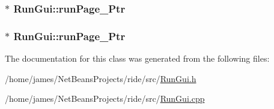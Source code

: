 \hypertarget{class_run_gui_a86764c1a0c9629fbce62c7cb13c5ee07}{
\subsubsection[{run\-Page\-\_\-2\-Ptr}]{$\ast$ Run\-Gui\-::run\-Page\-\_\-Ptr\hspace{0.3cm}{\ttfamily [private]}}}\label{class_run_gui_a86764c1a0c9629fbce62c7cb13c5ee07}
\hypertarget{class_run_gui_a7306b4df6c8619a98da052935a021cf8}{
\subsubsection[{run\-Page\-\_\-3\-Ptr}]{$\ast$ Run\-Gui\-::run\-Page\-\_\-Ptr\hspace{0.3cm}{\ttfamily [private]}}}\label{class_run_gui_a7306b4df6c8619a98da052935a021cf8}


The documentation for this class was generated from the following files\-:\begin{DoxyCompactItemize}
\item 
/home/james/\-Net\-Beans\-Projects/ride/src/\hyperlink{_run_gui_8h}{Run\-Gui.\-h}\item 
/home/james/\-Net\-Beans\-Projects/ride/src/\hyperlink{_run_gui_8cpp}{Run\-Gui.\-cpp}\end{DoxyCompactItemize}
